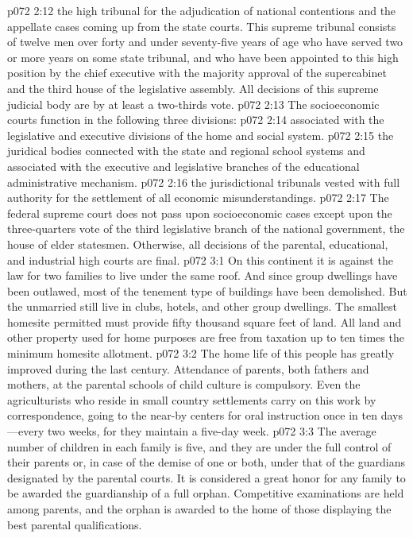 \pc \vs p072 2:12 \bibnobreakspace {}the high tribunal for the adjudication of national contentions and the appellate cases coming up from the state courts. This supreme tribunal consists of twelve men over forty and under seventy\hyp{}five years of age who have served two or more years on some state tribunal, and who have been appointed to this high position by the chief executive with the majority approval of the supercabinet and the third house of the legislative assembly. All decisions of this supreme judicial body are by at least a two\hyp{}thirds vote.
\pc \vs p072 2:13 The socioeconomic courts function in the following three divisions:
\pc \vs p072 2:14 \bibnobreakspace {} associated with the legislative and executive divisions of the home and social system.
\pc \vs p072 2:15 \bibnobreakspace {}the juridical bodies connected with the state and regional school systems and associated with the executive and legislative branches of the educational administrative mechanism.
\pc \vs p072 2:16 \bibnobreakspace {}the jurisdictional tribunals vested with full authority for the settlement of all economic misunderstandings.
\pc \vs p072 2:17 The federal supreme court does not pass upon socioeconomic cases except upon the three\hyp{}quarters vote of the third legislative branch of the national government, the house of elder statesmen. Otherwise, all decisions of the parental, educational, and industrial high courts are final.
\vs p072 3:1 On this continent it is against the law for two families to live under the same roof. And since group dwellings have been outlawed, most of the tenement type of buildings have been demolished. But the unmarried still live in clubs, hotels, and other group dwellings. The smallest homesite permitted must provide fifty thousand square feet of land. All land and other property used for home purposes are free from taxation up to ten times the minimum homesite allotment.
\vs p072 3:2 The home life of this people has greatly improved during the last century. Attendance of parents, both fathers and mothers, at the parental schools of child culture is compulsory. Even the agriculturists who reside in small country settlements carry on this work by correspondence, going to the near\hyp{}by centers for oral instruction once in ten days---every two weeks, for they maintain a five\hyp{}day week.
\vs p072 3:3 The average number of children in each family is five, and they are under the full control of their parents or, in case of the demise of one or both, under that of the guardians designated by the parental courts. It is considered a great honor for any family to be awarded the guardianship of a full orphan. Competitive examinations are held among parents, and the orphan is awarded to the home of those displaying the best parental qualifications.
